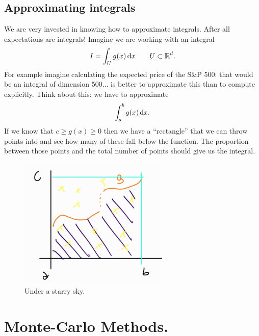 \documentclass[12pt]{report}
\begin{document}
\subsection{Approximating integrals}
We are very invested in knowing how to approximate integrals. After all expectations are integrals! Imagine we are working with an integral
\begin{equation*}
	I=\int_{U}g(x)\mathop{}\!\mathrm{d} x\qquad U\subset\mathbb{R}^{d}.
\end{equation*}
For example imagine calculating the expected price of the S\&P 500: that would be an integral of dimension 500... is better to approximate this than to compute explicitly.
Think about this: we have to approximate
	\begin{equation*}
		\int_{a}^{b}g(x)\mathop{}\!\mathrm{d} x.
	\end{equation*}
	If we know that $c\geq g(x)\geq0$ then we have a ``rectangle'' that we can throw points into and see how many of these fall below the function. The proportion between those points and the total number of points should give us the integral.
	\begin{figure}[h]
		\centering
		\includegraphics[width=0.6\linewidth]{img/screenshot063}
		\caption{Under a starry sky.}
		\label{fig:screenshot063}
	\end{figure}
\section{Monte-Carlo Methods.}
\listoffigures  
\end{document}
